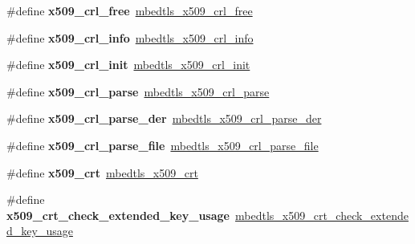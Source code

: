 \begin{DoxyCompactItemize}
\#define {\bfseries x509\+\_\+crl\+\_\+free}~\mbox{\hyperlink{group__x509__module_gaeb19c3326889f9e493fbd605c1113b96}{mbedtls\+\_\+x509\+\_\+crl\+\_\+free}}
\item 
\mbox{\label{compat-1_83_8h_ae61070c7b6f62a32c7f4f011622c5d2e}} 
\#define {\bfseries x509\+\_\+crl\+\_\+info}~\mbox{\hyperlink{group__x509__module_ga35898e101f5039c6db6b930da9892366}{mbedtls\+\_\+x509\+\_\+crl\+\_\+info}}
\item 
\mbox{\label{compat-1_83_8h_a2caca7c26dcce8b88095087c160edd37}} 
\#define {\bfseries x509\+\_\+crl\+\_\+init}~\mbox{\hyperlink{group__x509__module_ga8513a192e281217802837571da98e218}{mbedtls\+\_\+x509\+\_\+crl\+\_\+init}}
\item 
\mbox{\label{compat-1_83_8h_a17881dba5c4b54974d9c19ef81871457}} 
\#define {\bfseries x509\+\_\+crl\+\_\+parse}~\mbox{\hyperlink{group__x509__module_gadfce4fc5f5af62e371695e74c5b67d70}{mbedtls\+\_\+x509\+\_\+crl\+\_\+parse}}
\item 
\mbox{\label{compat-1_83_8h_aaa9f291a0715745c8d12e2eb9a56a67d}} 
\#define {\bfseries x509\+\_\+crl\+\_\+parse\+\_\+der}~\mbox{\hyperlink{group__x509__module_ga29ab5f1216a727b334ee26cce9f5d4b5}{mbedtls\+\_\+x509\+\_\+crl\+\_\+parse\+\_\+der}}
\item 
\mbox{\label{compat-1_83_8h_a134f8298f2b944563c9f760f37979931}} 
\#define {\bfseries x509\+\_\+crl\+\_\+parse\+\_\+file}~\mbox{\hyperlink{group__x509__module_ga8e096827f1240b8f8bc15d6a83593f22}{mbedtls\+\_\+x509\+\_\+crl\+\_\+parse\+\_\+file}}
\item 
\mbox{\label{compat-1_83_8h_a03f1397c5e27004ad4c41061aa2b2a2d}} 
\#define {\bfseries x509\+\_\+crt}~\mbox{\hyperlink{structmbedtls__x509__crt}{mbedtls\+\_\+x509\+\_\+crt}}
\item 
\mbox{\label{compat-1_83_8h_ab46192d64fe7264676c5872c0a082f9f}} 
\#define {\bfseries x509\+\_\+crt\+\_\+check\+\_\+extended\+\_\+key\+\_\+usage}~\mbox{\hyperlink{group__x509__module_gad21c0e75a3fdbeb1f65e4d339e479df3}{mbedtls\+\_\+x509\+\_\+crt\+\_\+check\+\_\+extended\+\_\+key\+\_\+usage}}
\item 
\mbox{\label{compat-1_83_8h_adcad083904d61e5a349560bd67acb4c5}} 

\end{DoxyCompactItemize}
